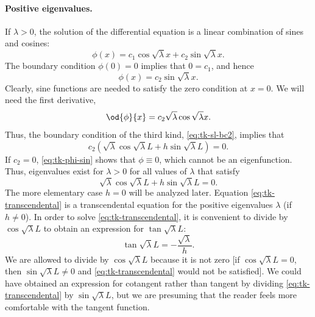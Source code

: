 \paragraph{Positive eigenvalues.}
If $\lambda > 0$, the solution of the differential equation is a linear combination of sines and cosines:
\begin{equation}
\label{eq:tk-pos-soln}
\phi(x) = c_1\cos\sqrt{\lambda}x + c_2\sin\sqrt{\lambda}x.
\end{equation}
The boundary condition $\phi(0) = 0$ implies that $0 = c_1$, and hence
\begin{equation}
\label{eq:tk-phi-sin}
\boxed{\phi(x) = c_2\sin\sqrt{\lambda}x.}
\end{equation}
Clearly, sine functions are needed to satisfy the zero condition at $x = 0$.  We will need the first derivative,
\[
\od{\phi}{x} = c_2\sqrt{\lambda}\cos\sqrt{\lambda}x.
\]
Thus, the boundary condition of the third kind, \eqref{eq:tk-sl-bc2}, implies that
\begin{equation}
\label{eq:tk-transcendental-pre}
c_2(\sqrt{\lambda}\cos\sqrt{\lambda}L + h\sin\sqrt{\lambda}L) = 0.
\end{equation}
If $c_2 = 0$, \eqref{eq:tk-phi-sin} shows that $\phi \equiv 0$, which cannot be an eigenfunction.  Thus, eigenvalues exist for $\lambda > 0$ for all values of $\lambda$ that satisfy
\begin{equation}
\label{eq:tk-transcendental}
\sqrt{\lambda}\cos\sqrt{\lambda}L + h\sin\sqrt{\lambda}L = 0.
\end{equation}
The more elementary case $h = 0$ will be analyzed later.  Equation \eqref{eq:tk-transcendental} is a transcendental equation for the positive eigenvalues $\lambda$ (if $h \neq 0$).  In order to solve \eqref{eq:tk-transcendental}, it is convenient to divide by $\cos\sqrt{\lambda}L$ to obtain an expression for $\tan\sqrt{\lambda}L$:
\begin{equation}
\label{eq:tk-tan}
\boxed{\tan\sqrt{\lambda}L = -\frac{\sqrt{\lambda}}{h}.}
\end{equation}
We are allowed to divide by $\cos\sqrt{\lambda}L$ because it is not zero [if $\cos\sqrt{\lambda}L = 0$, then $\sin\sqrt{\lambda}L \neq 0$ and \eqref{eq:tk-transcendental} would not be satisfied].  We could have obtained an expression for cotangent rather than tangent by dividing \eqref{eq:tk-transcendental} by $\sin\sqrt{\lambda}L$, but we are presuming that the reader feels more comfortable with the tangent function.

